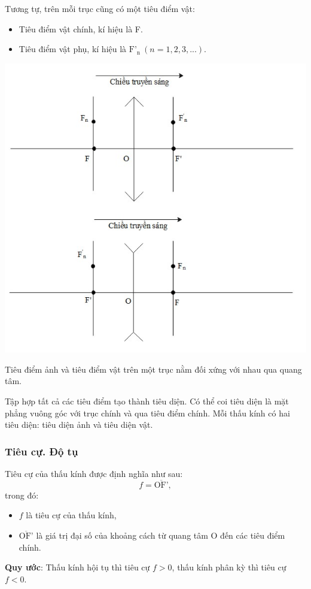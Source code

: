 Tương tự, trên mỗi trục cũng có một tiêu điểm vật:
\begin{itemize}
	\item Tiêu điểm vật chính, kí hiệu là F.
	\item Tiêu điểm vật phụ, kí hiệu là $\text{F'}_{\text{n}}\ (n=1,2,3,...)$.
\end{itemize}
\begin{center}
	\includegraphics[scale=0.8]{../figs/VN11-PH-38-L-026-1-h18.jpg}
\end{center}



Tiêu điểm ảnh và tiêu điểm vật trên một trục nằm đối xứng với nhau qua quang tâm.  

Tập hợp tất cả các tiêu điểm tạo thành tiêu diện. Có thể coi tiêu diện là mặt phẳng vuông góc với trục chính và qua tiêu điểm chính. Mỗi thấu kính có hai tiêu diện: tiêu diện ảnh và tiêu diện vật. 

	
\subsubsection{Tiêu cự. Độ tụ}
Tiêu cự của thấu kính được định nghĩa như sau:
\begin{equation}
f=\overline{\text{OF'}},
\end{equation}
trong đó:
\begin{itemize}
	\item $f$ là tiêu cự của thấu kính, 
	\item $\overline{\text{OF'}}$ là giá trị đại số của khoảng cách từ quang tâm O đến các tiêu điểm chính.
\end{itemize}
\textbf{Quy ước}: Thấu kính hội tụ thì tiêu cự $f>0$, thấu kính phân kỳ thì tiêu cự $f<0$.

